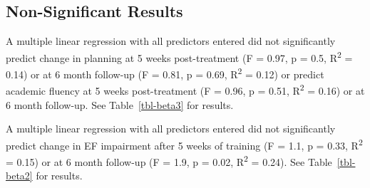 \documentclass[
  letterpaper,
]{ut-thesis}
\begin{document}
\subsection{Non-Significant Results}\label{non-significant-results}

A multiple linear regression with all predictors entered did not
significantly predict change in planning at 5 weeks post-treatment (F =
0.97, p = 0.5, R\textsuperscript{2} = 0.14) or at 6 month follow-up (F =
0.81, p = 0.69, R\textsuperscript{2} = 0.12) or predict academic fluency
at 5 weeks post-treatment (F = 0.96, p = 0.51, R\textsuperscript{2} =
0.16) or at 6 month follow-up. See Table~\ref{tbl-beta3} for results.

A multiple linear regression with all predictors entered did not
significantly predict change in EF impairment after 5 weeks of training
(F = 1.1, p = 0.33, R\textsuperscript{2} = 0.15) or at 6 month follow-up
(F = 1.9, p = 0.02, R\textsuperscript{2} = 0.24). See
Table~\ref{tbl-beta2} for results.
\end{document}

